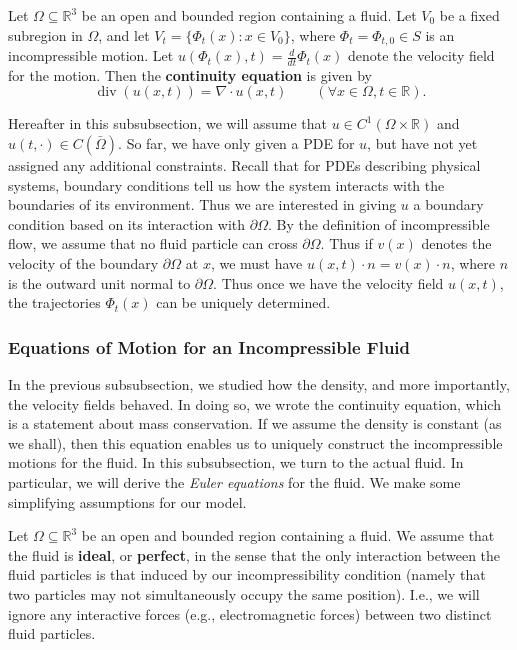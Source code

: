 \documentclass{article}
\begin{document}
\begin{prop}
	Let $\Omega \subseteq \mathbb{R}^{3}$ be an open and bounded region containing a fluid. Let $V_{0}$ be a fixed subregion in $\Omega$, and let $V_{t} = \{\Phi_{t}(x): x \in V_{0}\}$, where $\Phi_{t} = \Phi_{t,0} \in S$ is an incompressible motion. Let $u(\Phi_{t}(x), t) = \frac{d}{dt}\Phi_{t}(x)$ denote the velocity field for the motion. Then the \textbf{continuity equation} is given by 
	\begin{equation}
		\operatorname{div}(u(x,t)) = \nabla \cdot u(x, t) \qquad (\forall x \in \Omega, t \in \mathbb{R}). 
		\label{eq:conteq_incompressibleflows}
	\end{equation}
\end{prop} 
Hereafter in this subsubsection, we will assume that $u \in C^{1}(\Omega \times \mathbb{R})$ and $u(t, \cdot) \in C(\bar{\Omega})$. So far, we have only given a PDE for $u$, but have not yet assigned any additional constraints. Recall that for PDEs describing physical systems, boundary conditions tell us how the system interacts with the boundaries of its environment. Thus we are interested in giving $u$ a boundary condition based on its interaction with $\partial \Omega$. By the definition of incompressible flow, we assume that no fluid particle can cross $\partial \Omega$. Thus if $v(x)$ denotes the velocity of the boundary $\partial \Omega$ at $x$, we must have $u(x, t) \cdot n = v(x) \cdot n$, where $n$ is the outward unit normal to $\partial \Omega$. Thus once we have the velocity field $u(x, t)$, the trajectories $\Phi_{t}(x)$ can be uniquely determined. 

\subsubsection{Equations of Motion for an Incompressible Fluid} 

In the previous subsubsection, we studied how the density, and more importantly, the velocity fields behaved. In doing so, we wrote the continuity equation, which is a statement about mass conservation. If we assume the density is constant (as we shall), then this equation enables us to uniquely construct the incompressible motions for the fluid. In this subsubsection, we turn to the actual fluid. In particular, we will derive the \textit{Euler equations} for the fluid. We make some simplifying assumptions for our model. 

\begin{definition}
	Let $\Omega \subseteq \mathbb{R}^{3}$ be an open and bounded region containing a fluid. We assume that the fluid is \textbf{ideal}, or \textbf{perfect}, in the sense that the only interaction between the fluid particles is that induced by our incompressibility condition (namely that two particles may not simultaneously occupy the same position). I.e., we will ignore any interactive forces (e.g., electromagnetic forces) between two distinct fluid particles. 
\end{definition} 
\end{document}
